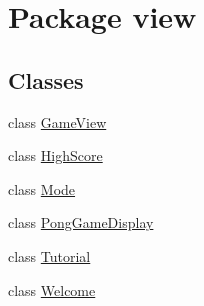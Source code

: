 \hypertarget{namespaceview}{}\section{Package view}
\label{namespaceview}
\subsection*{Classes}
\begin{DoxyCompactItemize}
\item 
class \hyperlink{classview_1_1_game_view}{Game\+View}
\item 
class \hyperlink{classview_1_1_high_score}{High\+Score}
\item 
class \hyperlink{classview_1_1_mode}{Mode}
\item 
class \hyperlink{classview_1_1_pong_game_display}{Pong\+Game\+Display}
\item 
class \hyperlink{classview_1_1_tutorial}{Tutorial}
\item 
class \hyperlink{classview_1_1_welcome}{Welcome}
\end{DoxyCompactItemize}
